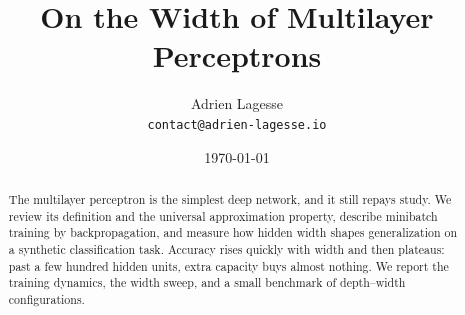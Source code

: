 \documentclass[final]{filao}
\title{On the Width of Multilayer Perceptrons}
\author{Adrien Lagesse \\ \texttt{contact@adrien-lagesse.io}}
\date{\today}
\begin{document}
\maketitle

\begin{abstract}
  The multilayer perceptron is the simplest deep network, and it still repays
  study. We review its definition and the universal approximation property,
  describe minibatch training by backpropagation, and measure how hidden width
  shapes generalization on a synthetic classification task. Accuracy rises
  quickly with width and then plateaus: past a few hundred hidden units, extra
  capacity buys almost nothing. We report the training dynamics, the width
  sweep, and a small benchmark of depth--width configurations.
\end{abstract}









\end{document}
